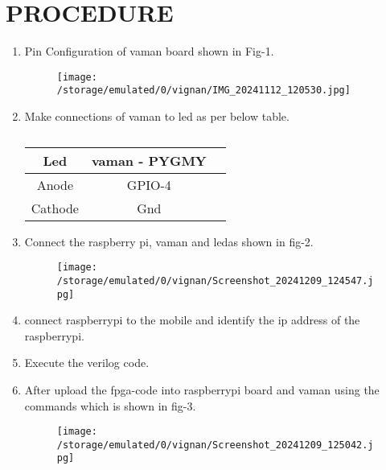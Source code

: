 \documentclass[conference]{IEEEtran}
\begin{document}
\section{PROCEDURE}
 \begin{enumerate}
\item Pin Configuration of vaman board shown in Fig-1.

\begin{figure}[h]                           
\centering                                 
\texttt{[image: 	/storage/emulated/0/vignan/IMG\_20241112\_120530.jpg]}                                           
\caption{\label{fig-3:Gates}}               
\end{figure}

\item Make connections of vaman to led as per below table.

\begin{table} [htbp]
\centering
\begin{tabular}{| c | c | c |} \hline
Led  & vaman - PYGMY  \\\hline
Anode &  GPIO-4 \\ \hline
Cathode  & Gnd \\  
\hline
\end{tabular}
\vspace{0.1cm}
\caption{\label{tab:widgets}}
\end{table}
\item Connect the raspberry pi, vaman and ledas shown in fig-2.
	\begin{figure}[h]                      
\centering                                
\texttt{[image:  
     /storage/emulated/0/vignan/Screenshot\_20241209\_124547.jpg]}                               
\caption{\label{fig-2:Gates}}             
\end{figure}
\item connect raspberrypi to the mobile and identify the ip address of the raspberrypi.
\item Execute the verilog code.
\item After upload the fpga-code into raspberrypi board and vaman using the commands which is shown in fig-3.
\begin{figure}[h]                       
\centering                               
\texttt{[image:  
/storage/emulated/0/vignan/Screenshot\_20241209\_125042.jpg]}                                
\caption{\label{fig-3:Gates}}             
\end{figure}


 \end{enumerate}
\end{document}
